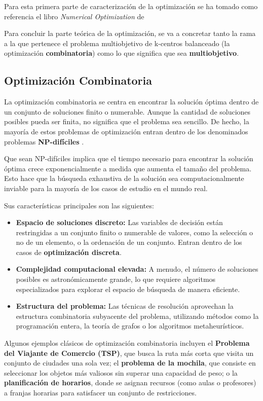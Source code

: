 \documentclass[12pt,a4paper]{book}
\begin{document}
Para esta primera parte de caracterización de la optimización se ha tomado como referencia el libro \textit{Numerical Optimization} de \cite{Numerical_optimization_nocedal_wright} 

Para concluir la parte teórica de la optimización, se va a concretar tanto la rama a la que pertenece el problema multiobjetivo de k-centros balanceado (la optimización \textbf{combinatoria}) como lo que significa que sea \textbf{multiobjetivo}.

\subsection{Optimización Combinatoria}
La optimización combinatoria se centra en encontrar la solución óptima dentro de un conjunto de soluciones finito o numerable. Aunque la cantidad de soluciones posibles pueda ser finita, no significa que el problema sea sencillo.
De hecho, la mayoría de estos problemas de optimización entran dentro de los denominados problemas \textbf{NP-difíciles} \citep{np_hard}.

Que sean NP-difíciles implica que el tiempo necesario para encontrar la solución óptima crece exponencialmente a medida que aumenta el tamaño del problema. Esto hace que la búsqueda exhaustiva de la solución sea computacionalmente inviable para la mayoría de los casos de estudio en el mundo real.

Sus características principales son las siguientes:
\begin{itemize}
    \item \textbf{Espacio de soluciones discreto:} Las variables de decisión están restringidas a un conjunto finito o numerable de valores, como la selección o no de un elemento, o la ordenación de un conjunto. Entran dentro de los casos de \textbf{optimización discreta}. 
    \item \textbf{Complejidad computacional elevada:} A menudo, el número de soluciones posibles es astronómicamente grande, lo que requiere algoritmos especializados para explorar el espacio de búsqueda de manera eficiente.
    \item \textbf{Estructura del problema:} Las técnicas de resolución aprovechan la estructura combinatoria subyacente del problema, utilizando métodos como la programación entera, la teoría de grafos o los algoritmos metaheurísticos.
\end{itemize}

Algunos ejemplos clásicos de optimización combinatoria incluyen el \textbf{Problema del Viajante de Comercio (TSP)}, 
que busca la ruta más corta que visita un conjunto de ciudades una sola vez;
el \textbf{problema de la mochila}, que consiste en seleccionar los objetos más valiosos sin superar una capacidad de peso;
o la \textbf{planificación de horarios}, donde se asignan recursos (como aulas o profesores) a franjas horarias para satisfacer un conjunto de restricciones.
\end{document}
